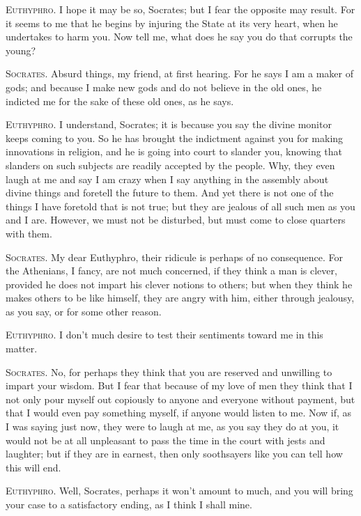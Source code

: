 \textsc{Euthyphro}. I hope it may be so, Socrates; but I fear the
opposite may result. For it seems to me that he begins by injuring the
State at its very heart, when he undertakes to harm you. Now tell me,
what does he say you do that corrupts the young?

\textsc{Socrates}. Absurd things, my friend, at first hearing. For he
says I am a maker of gods; and because I make new gods and do not
believe in the old ones, he indicted me for the sake of these old
ones, as he says.

\textsc{Euthyphro}. I understand, Socrates; it is because 
you say the divine monitor keeps coming to you. So he has brought the
indictment against you for making innovations in religion, and he is
going into court to slander you, knowing that slanders on such
subjects are readily accepted by the people. Why, they even laugh at
me and say I am crazy when I say anything in the assembly about divine
things and foretell the future to them. And yet there is not one of
the things I have foretold that is not true; but they are jealous of
all such men as you and I are. However, we must not be disturbed, but
must come to close quarters with them.

\textsc{Socrates}. My dear Euthyphro, their ridicule is perhaps of no
consequence. For the Athenians, I fancy, are not much concerned, if
they think a man is clever, provided he does not impart his clever
notions to others; but when they think he makes others to be like
himself, they are angry with him, either through jealousy, as you say,
or for some other reason.

\textsc{Euthyphro}. I don't much desire to test their sentiments
toward me in this matter.

\textsc{Socrates}. No, for perhaps they think that you are reserved
and unwilling to impart your wisdom. But I fear that because of my
love of men they think that I not only pour myself out copiously to
anyone and everyone without payment, but that I would even pay
something myself, if anyone would listen to me. Now if, as I was
saying just now, they were to laugh at me, as you say they do at you,
it would not be at all unpleasant to pass the time in the court with
jests and laughter; but if they are in earnest, then only soothsayers
like you can tell how this will end.

\textsc{Euthyphro}. Well, Socrates, perhaps it won't amount
to much, and you will bring your case to a satisfactory ending, as I
think I shall mine.

